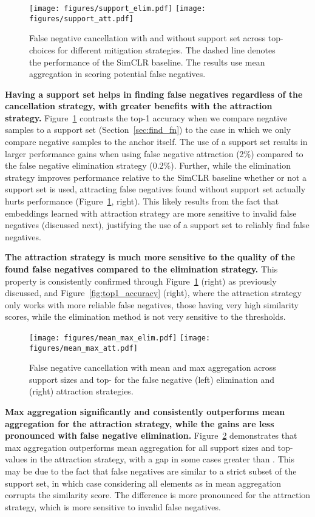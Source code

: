 \documentclass[10pt,twocolumn,letterpaper]{article}
\begin{document}
\begin{figure}[!b]
\texttt{[image: figures/support\_elim.pdf]} \hfil
\texttt{[image: figures/support\_att.pdf]}
\caption{False negative cancellation with and without support set across top- choices for different mitigation strategies. The dashed line denotes the performance of the SimCLR baseline. The results use mean aggregation in scoring potential false negatives.}
    \label{fig:support_topk}
\end{figure}
\textbf{Having a support set helps in finding false negatives regardless of the cancellation strategy, with greater benefits with the attraction strategy.} Figure~\ref{fig:support_topk} contrasts the top-1 accuracy when we compare negative samples to a support set (Section~\ref{sec:find_fn}) to the case in which we only compare negative samples to the anchor itself. The use of a support set results in larger performance gains when using false negative attraction (2\%) compared to the false negative elimination strategy (0.2\%). Further, while the elimination strategy improves performance relative to the SimCLR baseline whether or not a support set is used, attracting false negatives found without support set actually hurts performance (Figure~\ref{fig:support_topk}, right). This likely results from the fact that embeddings learned with attraction strategy are more sensitive to invalid false negatives (discussed next), justifying the use of a support set to reliably find false negatives.

\textbf{The attraction strategy is much more sensitive to the quality of the found false negatives compared to the elimination strategy.} This property is consistently confirmed through Figure~\ref{fig:support_topk} (right) as previously discussed, and Figure~\ref{fig:top1_accuracy} (right), where the attraction strategy only works with more reliable false negatives, those having very high similarity scores, while the elimination method is not very sensitive to the thresholds.

\begin{figure}[!t]
\texttt{[image: figures/mean\_max\_elim.pdf]} \hfil
\texttt{[image: figures/mean\_max\_att.pdf]}
\caption{False negative cancellation with mean and max aggregation across support sizes and top- for the false negative (left) elimination and (right) attraction strategies.} \label{fig:mean_max}
    \vspace{-5pt}
\end{figure}
\textbf{Max aggregation significantly and consistently outperforms mean aggregation for the attraction strategy, while the gains are less pronounced with false negative elimination.} Figure~\ref{fig:mean_max} demonstrates that max aggregation outperforms mean aggregation for all support sizes and top- values in the attraction strategy, with a gap in some cases greater than . This may be due to the fact that false negatives are similar to a strict subset of the support set, in which case considering all elements as in mean aggregation corrupts the similarity score. The difference is more pronounced for the attraction strategy, which is more sensitive to invalid false negatives.
\end{document}
